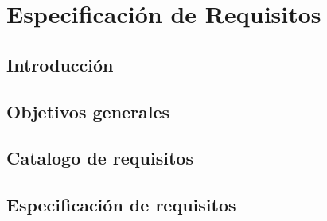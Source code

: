 \chapter{Especificación de Requisitos}
\label{cha:Especificación de Requisitos}

\section{Introducción}

\section{Objetivos generales}

\section{Catalogo de requisitos}

\section{Especificación de requisitos}
